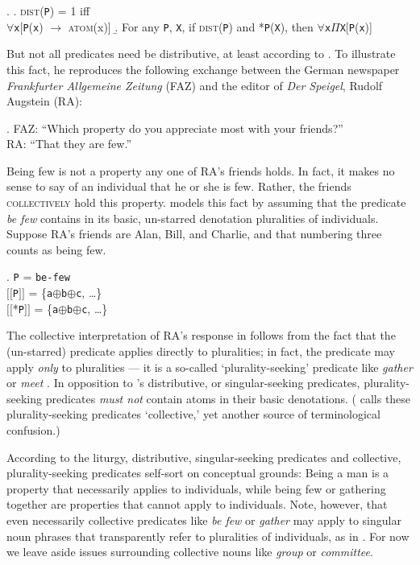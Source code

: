 \documentclass[linguex]{sp}
\newcommand{\sem}[1]{\mbox{$[\![$#1$]\!]$}}
\renewcommand{\tt}{\texttt}
\newcommand{\op}{$\oplus$}
\begin{document}
\ex. \a. \textsc{dist}(\texttt{P}) = 1 iff\\
$\forall$\texttt{x}[\texttt{P}(\texttt{x}) $\rightarrow$ \textsc{atom}(x)]
\b. For any \texttt{P}, \texttt{X}, if \textsc{dist}(\texttt{P}) and *\texttt{P}(\texttt{X}), then
$\forall$\texttt{x}$\Pi$\texttt{X}[\texttt{P}(\texttt{x})]


But not all predicates need be distributive, at least according to \citeauthor{link1983}. To illustrate this fact, he reproduces the following exchange between the German newspaper \emph{Frankfurter Allgemeine Zeitung} (FAZ) and the editor of \emph{Der Speigel}, Rudolf Augstein (RA): 

\ex. FAZ: ``Which property do you appreciate most with your friends?''\\
RA: ``That they are few.''

Being few is not a property any one of RA's friends holds. In fact, it makes no sense to say of an individual that he or she is few. Rather, the friends \textsc{collectively} hold this property. \citeauthor{link1983} models this fact by assuming that the predicate \emph{be few} contains in its basic, un-starred denotation pluralities of individuals. Suppose RA's friends are Alan, Bill, and Charlie, and that numbering three counts as being few.

\ex. \tt{P} = \tt{be-few}\\
\sem{\tt{P}} = \{\tt{a}\op\tt{b}\op\tt{c}, \ldots\}\\
\sem{*\tt{P}} = \{\tt{a}\op\tt{b}\op\tt{c}, \ldots\}

The collective interpretation of RA's response in \LLast follows from the fact that the (un-starred) predicate applies directly to pluralities; in fact, the predicate may apply \emph{only} to pluralities --- it is a so-called `plurality-seeking' predicate like \emph{gather} or \emph{meet} \citep{schwarzschild1994}. In opposition to \citeauthor{link1983}'s distributive, or singular-seeking predicates, plurality-seeking predicates \emph{must not} contain atoms in their basic denotations. (\citeauthor{link1983} calls these plurality-seeking predicates `collective,' yet another source of terminological confusion.)

According to the liturgy, distributive, singular-seeking predicates and collective, plurality-seeking predicates self-sort on conceptual grounds: Being a man is a property that necessarily applies to individuals, while being few or gathering together are properties that cannot apply to individuals. Note, however, that even necessarily collective predicates like \emph{be few} or \emph{gather} may apply to singular noun phrases that transparently refer to pluralities of individuals, as in \Next. For now we leave aside issues surrounding collective nouns like \emph{group} or \emph{committee}. %
\end{document}
